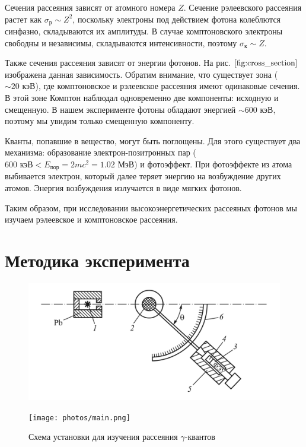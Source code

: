 \documentclass[12pt,a4paper]{article}
\begin{document}
	Сечения рассеяния зависят от атомного номера $Z$. Сечение рэлеевского рассеяния растет как $\sigma_{\text{р}} \sim Z^2$, поскольку электроны под действием фотона колеблются синфазно, складываются их амплитуды. В случае комптоновского электроны свободны и независимы, складываются интенсивности, поэтому $\sigma_{\text{к}} \sim Z$.
	
	Также сечения рассеяния зависят от энергии фотонов. На рис. $\ref{fig:cross_section}$ изображена данная зависимость. Обратим внимание, что существует зона ($\sim 20 \text{ кэВ}$), где комптоновское и рэлеевское рассеяния имеют одинаковые сечения. В этой зоне Комптон наблюдал одновременно две компоненты: исходную и смещенную.
	В нашем эксперименте фотоны обладают энергией $\sim 600 \text{ кэВ}$, поэтому мы увидим только смещенную компоненту.

	Кванты, попавшие в вещество, могут быть поглощены. Для этого существует два механизма: образование электрон-позитронных пар ($600 \text{ кэВ} < E_{\text{пор}} = 2mc^2 = 1.02 \text{ МэВ}$) и фотоэффект. При фотоэффекте из атома выбивается электрон, который далее теряет энергию на возбуждение других атомов. Энергия возбуждения излучается в виде мягких фотонов. 
	
	Таким образом, при исследовании высокоэнергетических рассеяных фотонов мы изучаем рэлеевское и комптоновское рассеяния.

	\vspace{20pt}
	\section*{Методика эксперимента}
	
	
	\begin{figure}[H]
		\centering
		\begin{minipage}{0.6\textwidth}
			\centering
			\includegraphics[width=1.0\linewidth]{res/scheme.png}
			\label{fig:scheme}
		\end{minipage}%
		\begin{minipage}{0.4\textwidth}
			\centering
			\texttt{[image: photos/main.png]}			\label{fig:main_photo}
		\end{minipage}
		\caption{Схема установки для изучения рассеяния $\gamma$-квантов}
	\end{figure}
		
\end{document}

